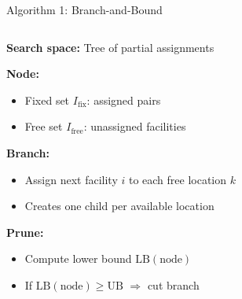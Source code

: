 \documentclass[aspectratio=169,11pt]{beamer}
\begin{document}

\begin{frame}{Algorithm 1: Branch-and-Bound}

\begin{columns}[T]

\begin{column}{0.43\textwidth}
  \textbf{Search space:} Tree of partial assignments


  \textbf{Node:}
  \begin{itemize}
    \item Fixed set $I_{\text{fix}}$: assigned pairs
    \item Free set $I_{\text{free}}$: unassigned facilities
  \end{itemize}


  \textbf{Branch:}
  \begin{itemize}
    \item Assign next facility $i$ to each free location $k$
    \item Creates one child per available location
  \end{itemize}


  \textbf{Prune:}
  \begin{itemize}
    \item Compute lower bound $\text{LB}(\text{node})$
    \item If $\text{LB}(\text{node}) \geq \text{UB}$ $\Rightarrow$ \alert{cut branch}
  \end{itemize}
\end{column}

\begin{column}{0.53\textwidth}
  \centering
  \begin{tikzpicture}[
    every node/.style={
      draw, rounded corners=3pt,
      font=\scriptsize,
      minimum width=.9cm,
      minimum height=0.5cm,
      fill=blue!10
    },
    pruned/.style={fill=red!20, draw=red},
    invisible/.style={fill=white, draw=none},
    level distance=1.1cm,
    sibling distance=2cm,
    edge from parent/.style={draw, -stealth, thin},
    edge from parentx/.style={draw=none},
    label style/.style={draw=none, fill=none, font=\tiny}
  ]


\end{tikzpicture}
\end{column}
\end{columns}
\end{frame}
\end{document}

